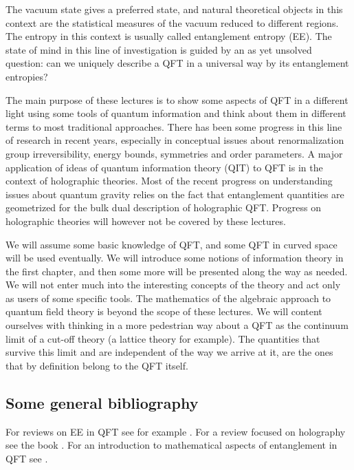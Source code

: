 \documentclass[12pt]{article}
\numberwithin{equation}{section}
\begin{document}
The vacuum state gives a preferred state, and natural theoretical objects in this context are the statistical measures of the vacuum reduced to different regions. The entropy in this context is usually called entanglement entropy (EE). The state of mind in this line of investigation is guided by an as yet unsolved question: can we uniquely describe a QFT in a universal way by its entanglement entropies?   
   
The main purpose of these lectures is to show some aspects of QFT in a different light using some tools of quantum information and think about them in different terms to most traditional approaches. There has been some progress in this line of research in recent years, especially in conceptual issues about renormalization group irreversibility, energy bounds, symmetries and order parameters. A major application of ideas of quantum information theory (QIT) to QFT is in the context of holographic theories. Most of the recent progress on understanding issues about quantum gravity relies on the fact that entanglement quantities are geometrized for the bulk dual description of holographic QFT. Progress on holographic theories will however not be covered by these lectures.    

We will assume some basic knowledge of QFT, and some QFT in curved space will be used eventually. We will introduce some notions of information theory in the first chapter, and then some more will be presented along the way as needed. We will not enter much into the interesting concepts of the theory and act only as users of some specific tools. The mathematics of the algebraic approach to quantum field theory is beyond the scope of these lectures. We will content ourselves with thinking in a more pedestrian way about a QFT as the continuum limit of a cut-off theory (a lattice theory for example).  
 The quantities that survive this limit and are independent of the way we arrive at it, are the ones that by definition belong to the QFT itself. 

\subsection{Some general bibliography}

For reviews on EE in QFT see for example \cite{Nishioka:2018khk,Calabrese:2009qy,Casini:2009sr}. 
For a review focused on holography see the book \cite{rangamani2017holographic}.
For an introduction to mathematical aspects of entanglement in QFT see \cite{Witten:2018lha, Hollands:2017dov}.
\end{document}
